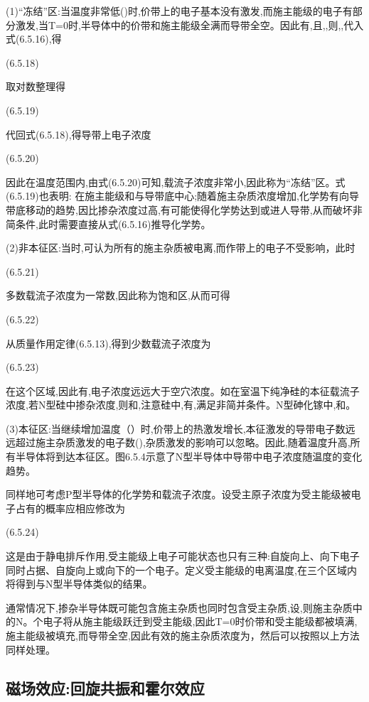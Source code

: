 (1)“冻结”区:当温度非常低()时,价带上的电子基本没有激发,而施主能级的电子有部分激发,当T=0时,半导体中的价带和施主能级全满而导带全空。因此有,且,,则,,代入式(6.5.16),得

 	(6.5.18)

取对数整理得

 	(6.5.19)

代回式(6.5.18),得导带上电子浓度

 	(6.5.20)

因此在温度范围内,由式(6.5.20)可知,载流子浓度非常小,因此称为“冻结”区。式(6.5.19)也表明: 在施主能级和与导带底中心;随着施主杂质浓度增加,化学势有向导带底移动的趋势,因比掺杂浓度过高,有可能使得化学势达到或进人导带,从而破坏非简条件,此时需要直接从式(6.5.16)推导化学势。

(2)非本征区:当时,可认为所有的施主杂质被电离,而作带上的电子不受影响，此时

	 (6.5.21)

多数载流子浓度为一常数,因此称为饱和区,从而可得

	(6.5.22)

从质量作用定律(6.5.13),得到少数载流子浓度为

	(6.5.23)

在这个区域,因此有,电子浓度远远大于空穴浓度。如在室温下纯净硅的本征载流子浓度,若N型硅中掺杂浓度,则和,注意硅中,有,满足非简并条件。N型砷化镓中,和。

(3)本征区:当继续增加温度（）时,价带上的热激发增长,本征激发的导带电子数远远超过施主杂质激发的电子数(),杂质激发的影响可以忽略。因此,随着温度升高,所有半导体将到达本征区。图6.5.4示意了N型半导体中导带中电子浓度随温度的变化趋势。



同样地可考虑P型半导体的化学势和载流子浓度。设受主原子浓度为受主能级被电子占有的概率应相应修改为

 	(6.5.24)

这是由于静电排斥作用,受主能级上电子可能状态也只有三种:自旋向上、向下电子同时占据、自旋向上或向下的一个电子。定义受主能级的电离温度,在三个区域内将得到与N型半导体类似的结果。

通常情况下,掺杂半导体既可能包含施主杂质也同时包含受主杂质,设,则施主杂质中的N。个电子将从施主能级跃迁到受主能级,因此T=0时价带和受主能级都被填满, 施主能级被填充,而导带全空,因此有效的施主杂质浓度为，然后可以按照以上方法同样处理。

\subsection{磁场效应:回旋共振和霍尔效应}

